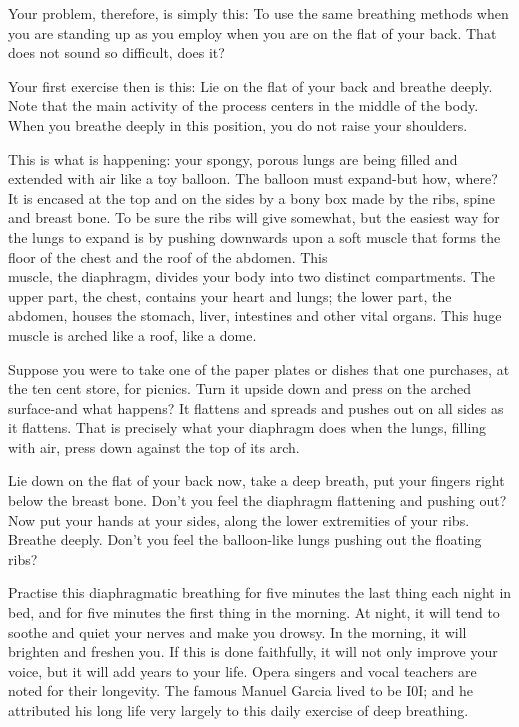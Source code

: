 \documentclass[10pt]{article}
\begin{document}
Your problem, therefore, is simply this: To use the same breathing methods when you are standing up as you employ when you are on the flat of your back. That does not sound so difficult, does it?

Your first exercise then is this: Lie on the flat of your back and breathe deeply. Note that the main activity of the process centers in the middle of the body. When you breathe deeply in this position, you do not raise your shoulders.

This is what is happening: your spongy, porous lungs are being filled and extended with air like a toy balloon. The balloon must expand-but how, where? It is encased at the top and on the sides by a bony box made by the ribs, spine and breast bone. To be sure the ribs will give somewhat, but the easiest way for the lungs to expand is by pushing downwards upon a soft muscle that forms the floor of the chest and the roof of the abdomen. This\\
muscle, the diaphragm, divides your body into two distinct compartments. The upper part, the chest, contains your heart and lungs; the lower part, the abdomen, houses the stomach, liver, intestines and other vital organs. This huge muscle is arched like a roof, like a dome.

Suppose you were to take one of the paper plates or dishes that one purchases, at the ten cent store, for picnics. Turn it upside down and press on the arched surface-and what happens? It flattens and spreads and pushes out on all sides as it flattens. That is precisely what your diaphragm does when the lungs, filling with air, press down against the top of its arch.

Lie down on the flat of your back now, take a deep breath, put your fingers right below the breast bone. Don't you feel the diaphragm flattening and pushing out? Now put your hands at your sides, along the lower extremities of your ribs. Breathe deeply. Don't you feel the balloon-like lungs pushing out the floating ribs?

Practise this diaphragmatic breathing for five minutes the last thing each night in bed, and for five minutes the first thing in the morning. At night, it will tend to soothe and quiet your nerves and make you drowsy. In the morning, it will brighten and freshen you. If this is done faithfully, it will not only improve your voice, but it will add years to your life. Opera singers and vocal teachers are noted for their longevity. The famous Manuel Garcia lived to be I0I; and he attributed his long life very largely to this daily exercise of deep breathing.
\end{document}
